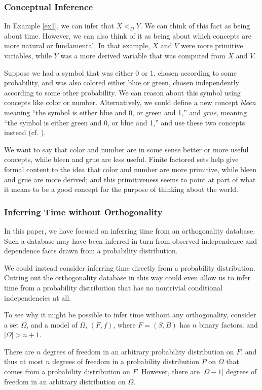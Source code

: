 \documentclass[authordate,onecolumn]{miri-tech-article}
\begin{document}
\subsubsection{Conceptual Inference}
In Example \ref{ex1}, we can infer that $X<_D Y$. We can think of this fact as being about time. However, we can also think of it as being about which concepts are more natural or fundamental. In that example, $X$ and $V$ were more primitive variables, while $Y$ was a more derived variable that was computed from $X$ and $V$.

Suppose we had a symbol that was either 0 or 1, chosen according to some probability, and was also colored either blue or green, chosen independently according to some other probability. We can reason about this symbol using concepts like color or number. Alternatively, we could define a new concept \emph{bleen} meaning ``the symbol is either blue and 0, or green and 1,'' and \emph{grue}, meaning ``the symbol is either green and 0, or blue and 1,'' and use these two concepts instead (cf. \cite{Goodman:1955}).

We want to say that color and number are in some sense better or more useful concepts, while bleen and grue are less useful. Finite factored sets help give formal content to the idea that color and number are more primitive, while bleen and grue are more derived; and this primitiveness seems to point at part of what it means to be a good concept for the purpose of thinking about the world.

\subsubsection{Inferring Time without Orthogonality}
In this paper, we have focused on inferring time from an orthogonality database. Such a database may have been inferred in turn from observed independence and dependence facts drawn from a probability distribution.

We could instead consider inferring time directly from a probability distribution. Cutting out the orthogonality database in this way could even allow us to infer time from a probability distribution that has no nontrivial conditional independencies at all. 

To see why it might be possible to infer time without any orthogonality, consider a set $\Omega$, and a model of $\Omega$, $(F,f)$, where $F=(S,B)$ has $n$ binary factors, and $|\Omega|>n+1$.

There are $n$ degrees of freedom in an arbitrary probability distribution on $F$, and thus at most $n$ degrees of freedom in a probability distribution $P$ on $\Omega$ that comes from a probability distribution on $F$. However, there are $|\Omega-1|$ degrees of freedom in an arbitrary distribution on $\Omega$.
\end{document}

